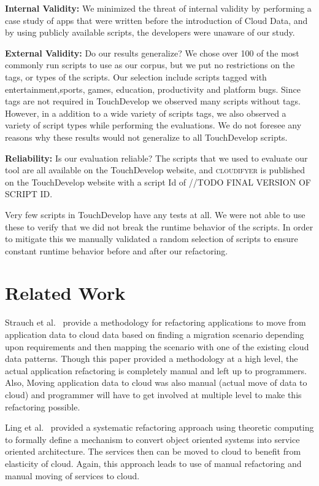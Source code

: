 \documentclass{sigplanconf}
\begin{document}
\textbf{Internal Validity:}  We minimized the threat of internal validity by performing a case study of apps that were written before the introduction of Cloud Data, and by using publicly available scripts, the developers were unaware of our study.  

\textbf{External Validity:}  Do our results generalize? We chose over 100 of the most commonly run scripts to use as our corpus, but we put no restrictions on the tags, or types of the scripts.  Our selection include scripts tagged with entertainment,sports, games, education, productivity and platform bugs.  Since tags are not required in TouchDevelop we observed many scripts without tags.  However, in a addition to a wide variety of scripts tags, we also observed a variety of script types while performing the evaluations.  We do not foresee any reasons why these results would not generalize to all TouchDevelop scripts.

\textbf{Reliability:} Is our evaluation reliable? The scripts that we used to evaluate our tool are all available on the TouchDevelop website, and \textsc{cloudifyer} is published on the TouchDevelop website with a script Id of //TODO FINAL VERSION OF SCRIPT ID.

Very few scripts in TouchDevelop have any tests at all.  We were not able to use these to verify that we did not break the runtime behavior of the scripts.  In order to mitigate this we manually validated a random selection of scripts to ensure constant runtime behavior before and after our refactoring.



\section{Related Work}
\label{sec:relatedWork}

Strauch et al.~\cite{strauchmigrating} provide a methodology for refactoring applications to move from application data to cloud data based on finding a migration scenario depending upon requirements and then mapping the scenario with one of the existing cloud data patterns. Though this paper provided a methodology at a high level, the actual application refactoring is completely manual and left up to programmers. Also, Moving application data to cloud was also manual (actual move of data to cloud) and programmer will have to get involved at multiple level to make this refactoring possible.  

Ling et al.~\cite{ling2010refactoring} provided a systematic refactoring approach using theoretic computing to formally define a mechanism to convert object oriented systems into service oriented architecture. The services then can be moved to cloud to benefit from elasticity of cloud. Again, this approach leads to use of manual refactoring and manual moving of services to cloud. 
\end{document}
